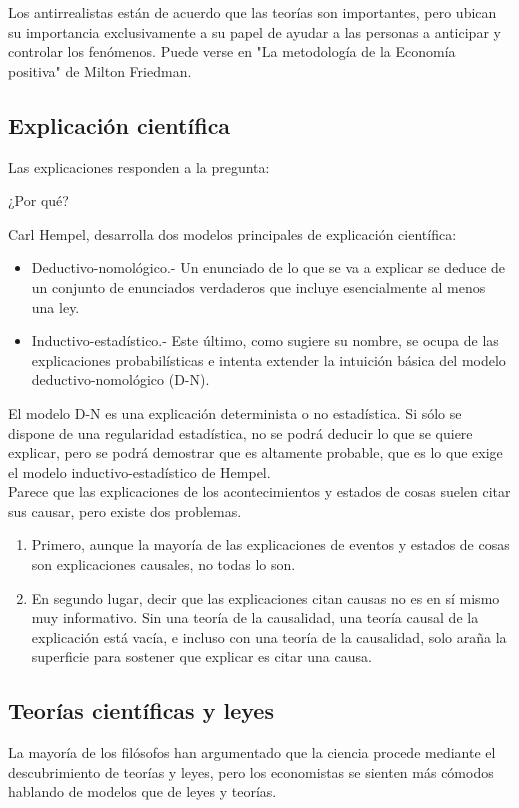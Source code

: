 Los antirrealistas están de acuerdo que las teorías son importantes, pero ubican su importancia exclusivamente a su papel de ayudar a las personas a anticipar y controlar los fenómenos. Puede verse en "La metodología de la Economía positiva" de Milton Friedman.


\subsection{Explicación científica}
Las explicaciones responden a la pregunta:
\begin{center}
    ¿Por qué?
\end{center}

Carl Hempel, desarrolla dos modelos principales de explicación científica:

\begin{itemize}
    \item Deductivo-nomológico.- Un enunciado de lo que se va a explicar se deduce de un conjunto de enunciados verdaderos que incluye esencialmente al menos una ley.
    \item Inductivo-estadístico.- Este último, como sugiere su nombre, se ocupa de las explicaciones probabilísticas e intenta extender la intuición básica del modelo deductivo-nomológico (D-N).
\end{itemize}

El modelo D-N es una explicación determinista o no estadística. Si sólo se dispone de una regularidad estadística, no se podrá deducir lo que se quiere explicar, pero se podrá demostrar que es altamente probable, que es lo que exige el modelo inductivo-estadístico de Hempel. \\
Parece que las explicaciones de los acontecimientos y estados de cosas suelen citar sus causar, pero existe dos problemas.
\begin{enumerate}
    \item Primero, aunque la mayoría de las explicaciones de eventos y estados de cosas son explicaciones causales, no todas lo son. 
    \item En segundo lugar, decir que las explicaciones citan causas no es en sí mismo muy informativo. Sin una teoría de la causalidad, una teoría causal de la explicación está vacía, e incluso con una teoría de la causalidad, solo araña la superficie para sostener que explicar es citar una causa. 
\end{enumerate}

\subsection{Teorías científicas y leyes}
La mayoría de los filósofos han argumentado que la ciencia procede mediante el descubrimiento de teorías y leyes, pero los economistas se sienten más cómodos hablando de modelos que de leyes y teorías.\\

